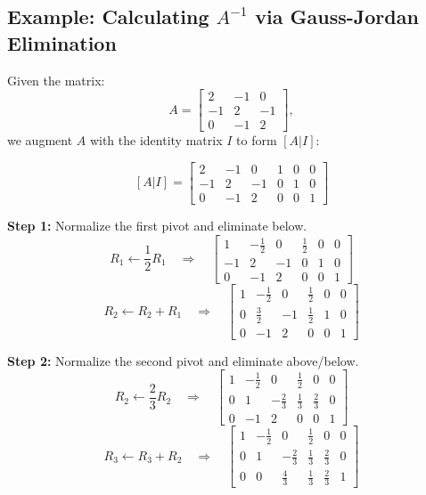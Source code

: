 \documentclass{article}
\begin{document}
\subsection{Example: Calculating \( A^{-1} \) via Gauss-Jordan Elimination}
Given the matrix:
\[
A = \begin{bmatrix}
2 & -1 & 0 \\
-1 & 2 & -1 \\
0 & -1 & 2
\end{bmatrix},
\]
we augment \( A \) with the identity matrix \( I \) to form \([A | I]\):

\[
[A | I] = \left[\begin{array}{ccc|ccc}
2 & -1 & 0 & 1 & 0 & 0 \\
-1 & 2 & -1 & 0 & 1 & 0 \\
0 & -1 & 2 & 0 & 0 & 1
\end{array}\right]
\]

\noindent \textbf{Step 1:} Normalize the first pivot and eliminate below.
\[
R_1 \leftarrow \frac{1}{2}R_1 \quad \Rightarrow \quad
\left[\begin{array}{ccc|ccc}
1 & -\frac{1}{2} & 0 & \frac{1}{2} & 0 & 0 \\
-1 & 2 & -1 & 0 & 1 & 0 \\
0 & -1 & 2 & 0 & 0 & 1
\end{array}\right]
\]
\[
R_2 \leftarrow R_2 + R_1 \quad \Rightarrow \quad
\left[\begin{array}{ccc|ccc}
1 & -\frac{1}{2} & 0 & \frac{1}{2} & 0 & 0 \\
0 & \frac{3}{2} & -1 & \frac{1}{2} & 1 & 0 \\
0 & -1 & 2 & 0 & 0 & 1
\end{array}\right]
\]

\noindent \textbf{Step 2:} Normalize the second pivot and eliminate above/below.
\[
R_2 \leftarrow \frac{2}{3}R_2 \quad \Rightarrow \quad
\left[\begin{array}{ccc|ccc}
1 & -\frac{1}{2} & 0 & \frac{1}{2} & 0 & 0 \\
0 & 1 & -\frac{2}{3} & \frac{1}{3} & \frac{2}{3} & 0 \\
0 & -1 & 2 & 0 & 0 & 1
\end{array}\right]
\]
\[
R_3 \leftarrow R_3 + R_2 \quad \Rightarrow \quad
\left[\begin{array}{ccc|ccc}
1 & -\frac{1}{2} & 0 & \frac{1}{2} & 0 & 0 \\
0 & 1 & -\frac{2}{3} & \frac{1}{3} & \frac{2}{3} & 0 \\
0 & 0 & \frac{4}{3} & \frac{1}{3} & \frac{2}{3} & 1
\end{array}\right]
\]
\end{document}
